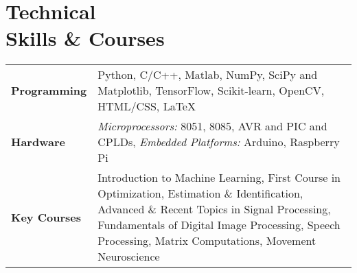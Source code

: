 \documentclass[margin,line, 9pt]{res}
\newenvironment{list1}{
  \begin{list}{\ding{113}}{%
      \setlength{\itemsep}{0in}
      \setlength{\parsep}{0in} \setlength{\parskip}{0in}
      \setlength{\topsep}{0in} \setlength{\partopsep}{0in} 
      \setlength{\leftmargin}{0.17in}}}{\end{list}}
\begin{document}
%
%
%


\section{\sc Technical \\Skills \& Courses}
\begin{tabular}{@{}p{1.3in}p{4.3in}}
\textbf{Programming} & Python, C/C++, Matlab, NumPy, SciPy and Matplotlib, TensorFlow, Scikit-learn, OpenCV,  HTML/CSS, \LaTeX \\  
\vspace*{-0.06in}
\textbf{Hardware} &
\vspace*{-0.06in}
\textit{Microprocessors:} 8051, 8085, AVR and PIC and CPLDs, \textit{Embedded Platforms:} Arduino, Raspberry Pi \\
\textbf{Key Courses} & Introduction to Machine Learning, First Course in Optimization, Estimation \& Identification, Advanced \& Recent Topics in Signal Processing, Fundamentals of Digital Image Processing, Speech Processing, Matrix Computations, Movement Neuroscience\\
%     
\end{tabular}
%
\end{document}

